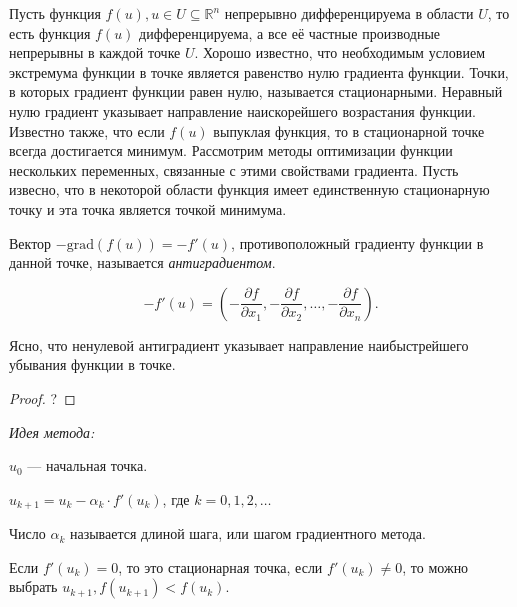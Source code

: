 
Пусть функция $f(u), u \in U \subseteq \mathbb{R}^n$ непрерывно дифференцируема в области $U$, то есть функция $f(u)$ дифференцируема, а все её частные производные непрерывны в каждой точке $U$. Хорошо известно, что необходимым условием экстремума функции в точке является равенство нулю градиента функции. Точки, в которых градиент функции равен нулю, называется стационарными. Неравный нулю градиент указывает направление наискорейшего возрастания функции. Известно также, что если $f(u)$ выпуклая функция, то в стационарной точке всегда достигается минимум. Рассмотрим методы оптимизации функции нескольких переменных, связанные с этими свойствами градиента. Пусть извесно, что в некоторой области функция имеет единственную стационарную точку и эта точка является точкой минимума. 

\begin{definition}
	Вектор $-\mathrm{grad}{(f(u))} = - f'(u)$, противоположный градиенту функции в данной точке, называется \textit{антиградиентом}. 
\end{definition}

\begin{utv}
	\begin{equation*}
		-f'(u) = \left(-\frac{\partial f}{\partial x_1}, -\frac{\partial f}{\partial x_2}, \dotsc, -\frac{\partial f}{\partial x_n}\right).
	\end{equation*}
\end{utv}

\begin{utv}
	Ясно, что ненулевой антиградиент указывает направление наибыстрейшего убывания функции в точке. 
\end{utv}

\begin{proof}
	? %
\end{proof}

\textit{Идея метода:}

$u_0$ --- начальная точка.

$u_{k + 1} = u_k - \alpha_k \cdot f'(u_k)$, где $k = 0, 1, 2, \dotsc$

Число $\alpha_k$ называется длиной шага, или шагом градиентного метода.

Если $f'(u_k) = 0$, то это стационарная точка, если $f'(u_k) \not = 0$, то можно выбрать $u_{k + 1}, f(u_{k + 1}) < f(u_k)$.

